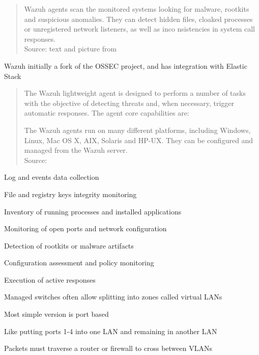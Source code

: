 \documentclass[Screen16to9,17pt]{foils}
\begin{document}


\begin{quote}\small
Wazuh agents scan the monitored systems looking for malware, rootkits and suspicious anomalies. They can detect hidden files, cloaked processes or unregistered network listeners, as well as inco
nsistencies in system call responses.\\
Source: text and picture from 
\end{quote}

\begin{list2}
\item Wazuh initially a fork of the OSSEC project, and has integration with Elastic Stack
\end{list2}



\begin{quote}\small
The Wazuh lightweight agent is designed to perform a number of tasks with the objective of detecting threats and, when necessary, trigger automatic responses. The agent core capabilities are:

The Wazuh agents run on many different platforms, including Windows, Linux, Mac OS X, AIX, Solaris and HP-UX. They can be configured and managed from the Wazuh server.\\
Source: 
\end{quote}

\begin{list2}
\item Log and events data collection
\item File and registry keys integrity monitoring
\item Inventory of running processes and installed applications
\item Monitoring of open ports and network configuration
\item Detection of rootkits or malware artifacts
\item Configuration assessment and policy monitoring
\item Execution of active responses
\end{list2}




\begin{list1}
\item Managed switches often allow splitting into zones called virtual LANs
\item Most simple version is port based
\item Like putting ports 1-4 into one LAN and remaining in another LAN
\item Packets must traverse a router or firewall to cross between VLANs
\end{list1}
\end{document}

